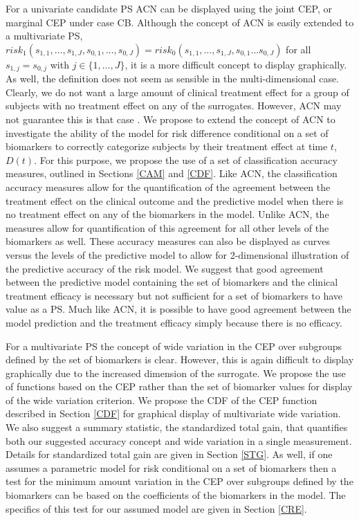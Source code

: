 \documentclass[times, doublespace]{simauth}
\begin{document}
For a univariate candidate PS ACN can be displayed using the joint CEP, or marginal CEP under case CB.  Although the concept of ACN is easily extended to a multivariate PS, $risk_1(s_{1,1}, \dots, s_{1,J} ,s_{0,1}, \dots, s_{0,J})=risk_0(s_{1,1}, \dots, s_{1,J} ,s_{0,1} \dots s_{0,J})$ for all $s_{1,j} = s_{0,j}$ with $j \in \{1, \dots, J\}$, it is a more difficult concept to display graphically. As well, the definition does not seem as sensible in the multi-dimensional case. Clearly, we do not want a large amount of clinical treatment effect for a group of subjects with no treatment effect on any of the surrogates. However, ACN may not guarantee this is that case \citep{Vanderweele11}. We propose to extend the concept of ACN to investigate the ability of the model for risk difference conditional on a set of biomarkers to correctly categorize subjects by their treatment effect at time $t$, $D(t)$. For this purpose, we propose the use of a set of classification accuracy measures, outlined in Sections \ref{CAM} and \ref{CDF}. Like ACN, the classification accuracy measures allow for the quantification of the agreement between the treatment effect on the clinical outcome and the predictive model when there is no treatment effect on any of the biomarkers in the model.  Unlike ACN, the measures allow for quantification of this agreement for all other levels of the biomarkers as well.  These accuracy measures can also be displayed as curves versus the levels of the predictive model to allow for 2-dimensional  illustration of the predictive accuracy of the risk model. We suggest that good agreement between the predictive model containing the set of biomarkers and the clinical treatment efficacy is necessary but not sufficient for a set of biomarkers to have value as a PS. Much like ACN, it is possible to have good agreement between the model prediction and the treatment efficacy simply because there is no efficacy. 

 For a multivariate PS the concept of wide variation in the CEP over subgroups defined by the set of biomarkers is clear. However, this is again difficult to display graphically due to the increased dimension of the surrogate. We propose the use of functions based on the CEP rather than the set of biomarker values for display of the wide variation criterion. We propose the CDF of the CEP function described in Section \ref{CDF} for graphical display of multivariate wide variation. We also suggest a summary statistic, the standardized total gain, that quantifies both our suggested accuracy concept and wide variation in a single measurement. Details for standardized total gain are given in Section \ref{STG}.  As well, if one assumes a parametric model for risk conditional on a set of biomarkers then a test for the minimum amount variation in the CEP over subgroups defined by the biomarkers can be based on the coefficients of the biomarkers in the model. The specifics of this test for our assumed model are given in Section \ref{CRE}.
\end{document}
